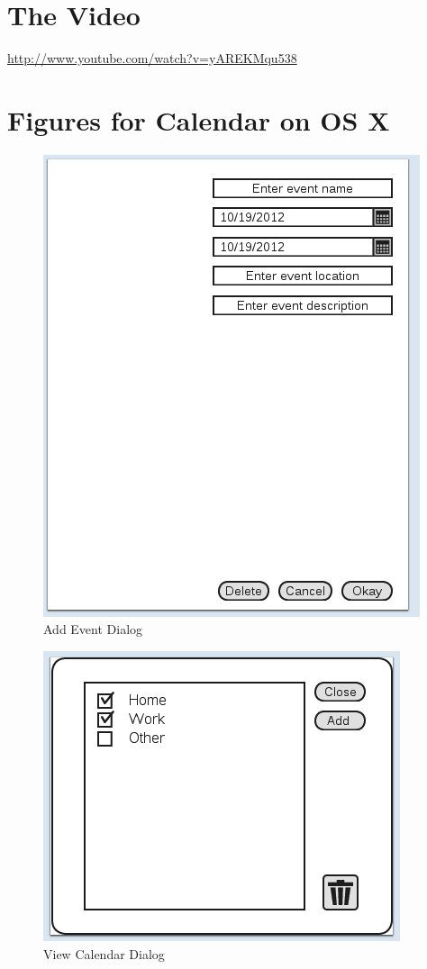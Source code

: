 \documentclass{article}
\begin{document}

\section{The Video}

\url{http://www.youtube.com/watch?v=yAREKMqu538}


\appendix

\section{Figures for Calendar on OS X}

\begin{figure}[hb]
\centering
\includegraphics[scale=0.7]{CMCLGDREvent.png}
\caption{Add Event Dialog}
\label{fig:addevent}
\end{figure}

\begin{figure}[hb]
\centering
\includegraphics[scale=1]{CMCLGDRViewCalendar.png}
\caption{View Calendar Dialog}
\label{fig:viewcal}
\end{figure}
\end{document}

